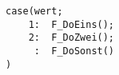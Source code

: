 \documentclass{article}
\begin{document}

\begin{lstlisting}
case(wert;
	1:	F_DoEins();
	2:	F_DoZwei();
	 :	F_DoSonst()
)
\end{lstlisting}
\end{document}
